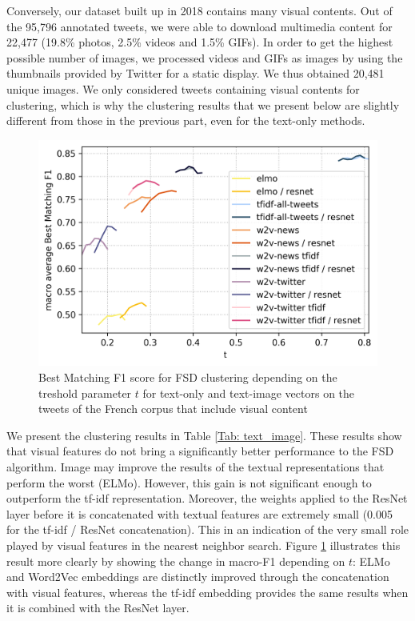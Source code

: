 Conversely, our dataset built up in 2018 contains many visual contents. Out of the 95,796 annotated tweets, we were able to download multimedia content for 22,477 (19.8\% photos, 2.5\% videos and 1.5\% GIFs). In order to get the highest possible number of images, we processed videos and GIFs as images by using the thumbnails provided by Twitter for a static display.  We thus obtained 20,481 unique images. We only considered tweets containing visual contents for clustering, which is why the clustering results that we present below are slightly different from those in the previous part, even for the text-only methods.


\begin{figure}[h]
  \centering
  \includegraphics[width=.7\linewidth]{figures/text_image_clustering.png}
  \caption{Best Matching F1 score for FSD clustering depending on the treshold parameter $t$ for text-only and text-image vectors on the tweets of the French corpus that include visual content}
  \label{Fig:text-image}
\end{figure}


We present the clustering results in Table \ref{Tab: text_image}. These results show that visual features do not bring a significantly better performance to the FSD algorithm. Image may improve the results of the textual representations that perform the worst (ELMo). However, this gain is not significant enough to outperform the tf-idf representation. Moreover, the weights applied to the ResNet layer before it is concatenated with textual features are extremely small (0.005 for the tf-idf / ResNet concatenation). This in an indication of the very small role played by visual features in the nearest neighbor search. Figure \ref{Fig:text-image} illustrates this result more clearly by showing the change in macro-F1 depending on $t$: ELMo and Word2Vec embeddings are distinctly improved through the concatenation with visual features, whereas the tf-idf embedding provides the same results when it is combined with the ResNet layer.

